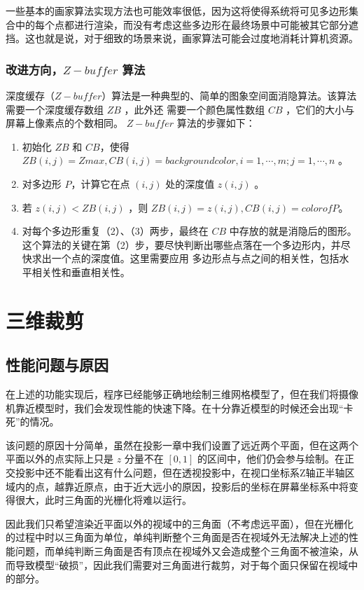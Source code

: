 \documentclass[12pt,oneside,a4paper]{ctexart}
\begin{document}
一些基本的画家算法实现方法也可能效率很低，因为这将使得系统将可见多边形集合中的每个点都进行渲染，而没有考虑这些多边形在最终场景中可能被其它部分遮挡。这也就是说，对于细致的场景来说，画家算法可能会过度地消耗计算机资源。
\subsubsection{改进方向，$Z-buffer$ 算法}
深度缓存（$Z-buffer$）算法是一种典型的、简单的图象空间面消隐算法。该算法需要一个深度缓存数组 $ZB$ ，此外还 需要一个颜色属性数组 $CB$ ，它们的大小与屏幕上像素点的个数相同。 $Z-buffer$ 算法的步骤如下：
\begin{enumerate}
	\item 初始化 $ZB$ 和 $CB$，使得 $ZB(i,j)=Zmax,CB(i,j)=backgroundcolor, i=1,\cdots ,m; j=1,\cdots,n$ 。
	\item 对多边形 $P$，计算它在点 $(i,j)$ 处的深度值 $z(i,j)$ 。
	\item 若 $z(i,j)<ZB(i,j)$ ，则 $ZB(i,j)=z(i,j),CB(i,j)=color of P$。
	\item 对每个多边形重复（2）、（3）两步，最终在 $CB$ 中存放的就是消隐后的图形。 这个算法的关键在第（2）步，要尽快判断出哪些点落在一个多边形内，并尽快求出一个点的深度值。这里需要应用 多边形点与点之间的相关性，包括水平相关性和垂直相关性。
\end{enumerate}

\section{三维裁剪}
\subsection{性能问题与原因}
在上述的功能实现后，程序已经能够正确地绘制三维网格模型了，但在我们将摄像机靠近模型时，我们会发现性能的快速下降。在十分靠近模型的时候还会出现“卡死”的情况。

该问题的原因十分简单，虽然在投影一章中我们设置了远近两个平面，但在这两个平面以外的点实际上只是 $z$ 分量不在 $[0,1]$ 的区间中，他们仍会参与绘制。在正交投影中还不能看出这有什么问题，但在透视投影中，在视口坐标系Z轴正半轴区域内的点，越靠近原点，由于近大远小的原因，投影后的坐标在屏幕坐标系中将变得很大，此时三角面的光栅化将难以运行。

因此我们只希望渲染近平面以外的视域中的三角面（不考虑远平面），但在光栅化的过程中时以三角面为单位，单纯判断整个三角面是否在视域外无法解决上述的性能问题，而单纯判断三角面是否有顶点在视域外又会造成整个三角面不被渲染，从而导致模型“破损”，因此我们需要对三角面进行裁剪，对于每个面只保留在视域中的部分。
\end{document}
